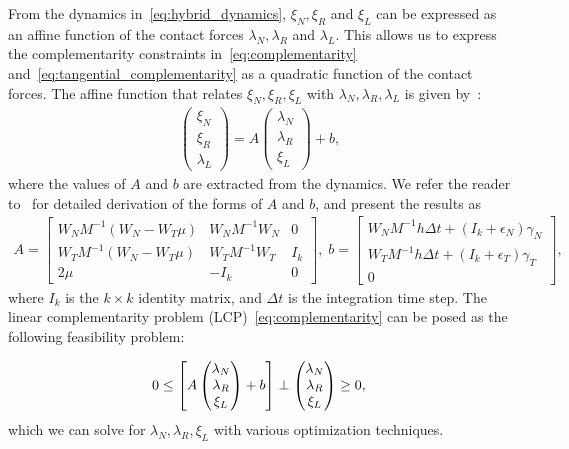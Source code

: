 {From the dynamics in~\eqref{eq:hybrid_dynamics}, $\xi_N, \xi_R$ and $\xi_L$ can
be expressed as an affine function of the contact forces $\lambda_N, \lambda_R$
and $\lambda_L$.
%
This allows us to express the complementarity constraints
in~\eqref{eq:complementarity} and~\eqref{eq:tangential_complementarity} as a
quadratic function of the contact forces.
%
The affine function that relates $\xi_N, \xi_R, \xi_L$ with $\lambda_N,
\lambda_R, \lambda_L$ is given by~\cite{glocker2005formulation}: 
\begin{align*}
  \begin{pmatrix}
    \xi_N \\
    \xi_R \\
    \lambda_L
  \end{pmatrix} =
      A
    \begin{pmatrix}
      \lambda_N \\
      \lambda_R \\
      \xi_L
    \end{pmatrix} + b, 
\end{align*}
\noindent where the values of $A$ and $b$ are extracted from the dynamics. We
refer the reader to~\cite{glocker2005formulation} for detailed derivation of the
forms of $A$ and $b$, and present the results as
\begin{gather*}
    A = \begin{bmatrix}
      W_N M^{-1} (W_N - W_T \mu) & W_N M^{-1} W_N & 0  \\
      W_T M^{-1} (W_N - W_T \mu) & W_T M^{-1} W_T & I_k  \\
      2\mu & -I_k & 0
    \end{bmatrix}, \;  b = \begin{bmatrix}
      W_N M^{-1} h \Delta t + (I_k+\epsilon_N) \gamma_N\\
      W_T M^{-1} h \Delta t + (I_k+\epsilon_T) \gamma_T\\
      0
    \end{bmatrix}, 
\end{gather*}
\noindent where $I_k$ is the $k \times k$
identity matrix, and $\Delta t$ is the integration time step.
%
The linear complementarity problem (LCP)~\eqref{eq:complementarity} can be posed as
the following feasibility problem:

\begin{equation}
    0 \leq 
    \left[ A \begin{pmatrix}
      \lambda_N \\
      \lambda_R \\
      \xi_L
    \end{pmatrix} + b \right]
    \perp
    \begin{pmatrix}
      \lambda_N \\
      \lambda_R \\
      \xi_L
    \end{pmatrix} \geq 0, \\
  \label{eq:feasibility} 
\end{equation}
\noindent which we can solve for $\lambda_N, \lambda_R, \xi_L$ with various
optimization techniques. 

}
